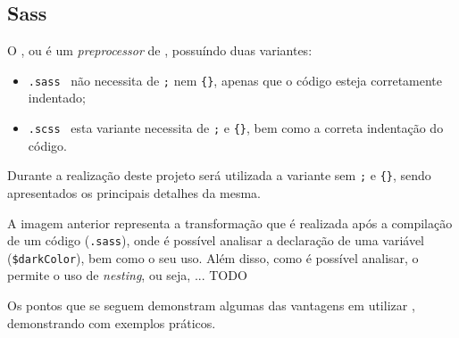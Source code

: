 \subsection{Sass}

\begin{minipage}{.3\textwidth}
\end{minipage}
\begin{minipage}{.7\textwidth}
	\minipagerestore
	O \textbf{}, ou \underline{} é um \textit{preprocessor} de \textbf{}, possuíndo duas variantes:

	\begin{itemize}
		\item \texttt{.sass} \textemdash~não necessita de \texttt{;} nem \verb|{}|, apenas que o código esteja corretamente indentado;
		\item \texttt{.scss} \textemdash~esta variante necessita de \texttt{;} e \verb|{}|, bem como a correta indentação do código.
	\end{itemize}
\end{minipage}

Durante a realização deste projeto será utilizada a variante sem \texttt{;} e \verb|{}|, sendo apresentados os principais detalhes da mesma.


A imagem anterior representa a transformação que é realizada após a compilação de um código \textbf{} (\texttt{.sass}), onde é possível analisar a declaração de uma variável (\verb|$darkColor|), bem como o seu uso. Além disso, como é possível analisar, o \textbf{} permite o uso de \textit{nesting}, ou seja, ... TODO

Os pontos que se seguem demonstram algumas das vantagens em utilizar \textbf{}, demonstrando com exemplos práticos.






